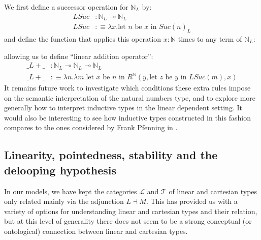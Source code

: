 \documentclass[a4paper,english]{lipics-v2018}
\begin{document}
We first define a successor operation for $\mathbb{N}_L$ by:
\[
  \begin{split}
    LSuc &:\mathbb{N}_L \multimap \mathbb{N}_L\\
    LSuc &:\equiv \lambda x. \text{let $n$ be $x$ in $Suc(n)_L$}
    \end{split}
\]
and define the function that applies this operation $x : \mathbb{N}$ times to any term of $\mathbb{N}_L$:
\begin{prooftree}
\end{prooftree}
allowing us to define ``linear addition operator'':
\[
  \begin{split}
    \_L+\_ &: \mathbb{N}_L \multimap \mathbb{N}_L \multimap \mathbb{N}_L\\
    \_L+\_ &:\equiv \lambda n. \lambda m. \text{let $x$ be $n$ in $R^{\mathbb{N}}(y, \text{let $z$ be $y$ in $LSuc(m)$}, x)$}
  \end{split}
\]
It remains future work to investigate which conditions these extra rules impose on the semantic interpretation of the natural numbers type, and to explore more generally how to interpret inductive types in the linear dependent setting. It would also be interesting to see how inductive types constructed in this fashion compares to the ones considered by Frank Pfenning in \cite{pfenning}.
  \subsection{Linearity, pointedness, stability and the delooping hypothesis}
  In our models, we have kept the categories $\mathcal{L}$ and $\mathcal{T}$ of linear and cartesian types only related mainly via the adjunction $L \dashv M$. This has provided us with a variety of options for understanding linear and cartesian types and their relation, but at this level of generality there does not seem to be a strong conceptual (or ontological) connection between linear and cartesian types.
\end{document}
